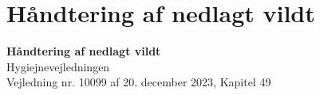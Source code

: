 \section{Håndtering af nedlagt vildt}

\begin{frame}
  \vspace{3em}
  \begin{center}
    {\LARGE \textbf{Håndtering af nedlagt vildt}
    }
    \\
    \vspace{1em}
    Hygiejnevejledningen
    \\
    \vspace{1em}
    Vejledning nr. 10099 af 20. december 2023, Kapitel 49
   \end{center}
\end{frame}










